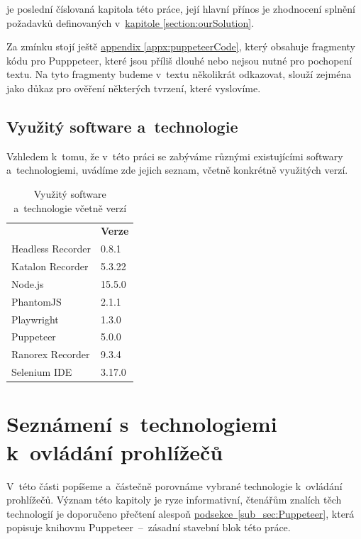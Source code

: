\documentclass[12pt, a4paper, twoside]{article}
\newcommand{\refAddedText}[3]{\hyperref[#1]{#2\ref{#1}#3}}
\newcommand*{\fullNameref}[1]{\hyperref[{#1}]{\ref{#1}~\nameref{#1}}}
\begin{document}
	 je poslední číslovaná kapitola této práce, její hlavní přínos je zhodnocení splnění požadavků definovaných v~\hyperref[section:ourSolution]{kapitole \ref{section:ourSolution}}.
	
	Za zmínku stojí ještě \hyperref[appx:puppeteerCode]{appendix \ref{appx:puppeteerCode}}, který obsahuje fragmenty kódu pro Pupppeteer, které jsou příliš dlouhé nebo nejsou nutné pro pochopení textu. Na tyto fragmenty budeme v~textu několikrát odkazovat, slouží zejména jako důkaz pro ověření některých tvrzení, které vyslovíme.
	
	\subsection{Využitý software a~technologie}
	Vzhledem k~tomu, že v~této práci se zabýváme různými existujícími softwary a~technologiemi, uvádíme zde jejich seznam, včetně konkrétně využitých verzí.
	\begin{table}[H]
	\centering
	\begin{tabular}{ l|l } 
		\rowcolor{tableHeadingBackground}
		\multicolumn{1}{l}{\textbf{Název}} & \multicolumn{1}{l}{\textbf{Verze}} \\
		Headless Recorder & 0.8.1 \\ 
		Katalon Recorder & 5.3.22 \\ 
		Node.js & 15.5.0\\
		PhantomJS & 2.1.1 \\
		Playwright & 1.3.0  \\
		Puppeteer & 5.0.0 \\
		Ranorex Recorder & 9.3.4 \\
		Selenium IDE & 3.17.0 \\
	\end{tabular}
	\caption{Využitý software a~technologie včetně verzí}
\end{table}
	\section{Seznámení s~technologiemi k~ovládání prohlížečů}
	\label{section:introToBrowserAut}
	V~této části popíšeme a~částečně porovnáme vybrané technologie k~ovládání prohlížečů. Význam této kapitoly je ryze informativní, čtenářům znalích těch technologií je doporučeno přečtení alespoň \refAddedText{sub_sec:Puppeteer}{podsekce~}{}, která popisuje knihovnu Puppeteer~--~zásadní stavební blok této práce.
\end{document}
